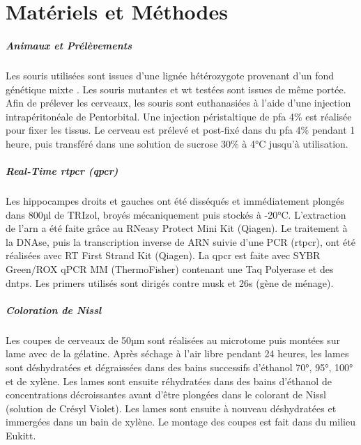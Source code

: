 \chapter{Matériels et Méthodes}

\paragraph{Animaux et Prélèvements}
\label{sec:AnimEtPrelev}
	Les souris utilisées sont issues d'une lignée hétérozygote provenant d'un fond génétique mixte \cite{Messeant2015, Messeant2017}. Les souris mutantes \mcrd et \gls{wt} testées sont issues de même portée. Afin de prélever les cerveaux, les souris sont  euthanasiées à l'aide d'une injection intrapéritonéale de Pentorbital. Une injection péristaltique de \gls{pfa} 4\% est réalisée pour fixer les tissus. Le cerveau est prélevé et post-fixé dans du \gls{pfa} 4\% pendant 1 heure, puis transféré dans une solution de sucrose 30\% à 4°C jusqu'à utilisation.
	
\paragraph{Real-Time \acrshort{rtpcr} (\acrshort{qpcr})}
\label{sec:qPCR}
	Les hippocampes droits et gauches ont été disséqués et immédiatement plongés dans 800µl de TRIzol\textregistered, broyés mécaniquement puis stockés à -20°C. L'extraction de l'\acrshort{arn} a été faite grâce au RNeasy Protect Mini Kit (Qiagen\textregistered). Le traitement à la DNAse, puis la transcription inverse de ARN suivie d'une PCR (\acrshort{rtpcr}), ont été réalisées avec RT First Strand Kit (Qiagen\textregistered). La \gls{qpcr} est faite avec SYBR Green/ROX qPCR MM (ThermoFisher\textregistered) contenant une Taq Polyerase et des \glspl{dntp}. Les primers utilisés sont dirigés contre \gls{musk} et \acrshort{26s} (gène de ménage).
	
\paragraph{Coloration de Nissl}
\label{sec:Nissl}
	Les coupes de cerveaux de 50µm sont réalisées au microtome puis montées sur lame avec de la gélatine. Après séchage à l'air libre pendant 24 heures, les lames sont déshydratées et dégraissées dans des bains successifs d'éthanol 70°, 95°, 100° et de xylène. Les lames sont ensuite réhydratées dans des bains d'éthanol de concentrations décroissantes avant d'être plongées dans le colorant de Nissl (solution de Crésyl Violet).  Les lames sont ensuite  à nouveau déshydratées et immergées dans un bain de xylène. Le montage des coupes est fait dans du milieu Eukitt\textregistered.
	
